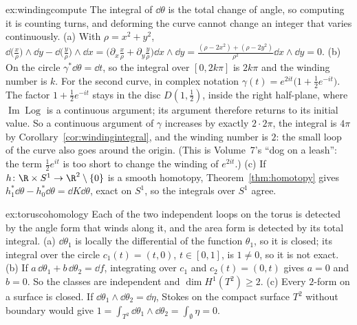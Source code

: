 \begin{solution}{ex:windingcompute}
\idea The integral of $\dd\theta$ is the total change of angle, so computing it is counting turns, and deforming the curve cannot change an integer that varies continuously.
\writeup (a) With $\rho=x^2+y^2$, $\dd\bigl(\frac x\rho\bigr)\wedge\dd y-\dd\bigl(\frac y\rho\bigr)\wedge\dd x=\bigl(\partial_x\frac x\rho+\partial_y\frac y\rho\bigr)\dd x\wedge\dd y=\frac{(\rho-2x^2)+(\rho-2y^2)}{\rho^2}\dd x\wedge\dd y=0$.
(b) On the circle $\gamma^*\dd\theta=\dd t$, so the integral over $[0,2k\pi]$ is $2k\pi$ and the winding number is $k$. For the second curve, in complex notation $\gamma(t)=e^{2it}\bigl(1+\frac12e^{-it}\bigr)$. The factor
$1+\frac12e^{-it}$ stays in the disc $D(1,\frac12)$, inside the right half-plane, where $\operatorname{Im}\operatorname{Log}$ is a continuous argument; its argument therefore
returns to its initial value. So a continuous argument of $\gamma$ increases by exactly $2\cdot2\pi$, the integral is $4\pi$ by Corollary~\ref{cor:windingintegral}, and the
winding number is $2$: the small loop of the curve also goes around the origin. (This is Volume~7's ``dog on a leash'': the term $\frac12e^{it}$ is too short to
change the winding of $e^{2it}$.) (c) If $h\colon\R\times S^1\to\R^2\setminus\{0\}$ is a smooth homotopy, Theorem~\ref{thm:homotopy} gives
$h_1^*\dd\theta-h_0^*\dd\theta=\dd K\dd\theta$, exact on $S^1$, so the integrals over $S^1$ agree.
\end{solution}

\begin{solution}{ex:toruscohomology}
\idea Each of the two independent loops on the torus is detected by the angle form that winds along it, and the area form is detected by its total integral.
\writeup (a) $\dd\theta_1$ is locally the differential of the function $\theta_1$, so it is closed; its integral over the circle $c_1(t)=(t,0)$, $t\in[0,1]$, is $1\ne0$, so it is not exact.
(b) If $a\,\dd\theta_1+b\,\dd\theta_2=\dd f$, integrating over $c_1$ and $c_2(t)=(0,t)$ gives $a=0$ and $b=0$. So the classes are independent and $\dim H^1(T^2)\ge2$. (c) Every $2$-form on
a surface is closed. If $\dd\theta_1\wedge\dd\theta_2=\dd\eta$, Stokes on the compact surface $T^2$ without boundary would give $1=\int_{T^2}\dd\theta_1\wedge\dd\theta_2=\int_{\emptyset}\eta=0$.
\end{solution}

